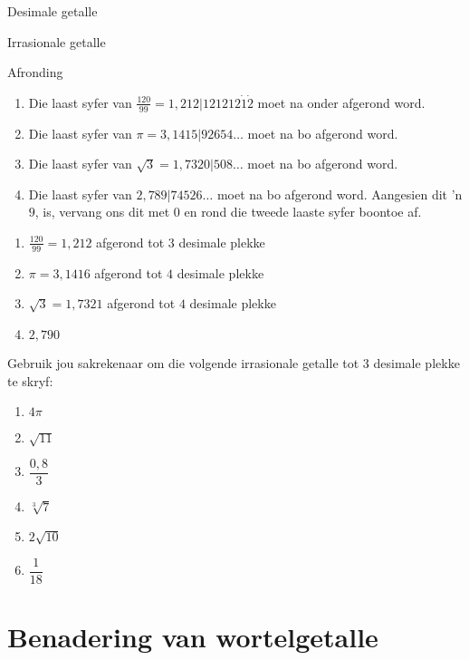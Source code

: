 \begin{Aktiwiteit}{Desimale getalle}
\begin{aktiwiteit}{Irrasionale getalle}
\begin{wex}{Afronding }
{
\begin{enumerate}[itemsep=5pt, label=\textbf{\arabic*}. ]
\item Die laast syfer van $\frac{120}{99}=1,212|121212\dot{1}\dot{2}$  moet na onder afgerond word.
\item Die laast syfer van $\pi =3,1415|92654\ldots$ moet na bo afgerond word.
\item Die laast syfer van $\sqrt{3}=1,7320|508\ldots$ moet na bo afgerond word.
\item Die laast syfer van $2,789|74526\ldots$ moet na bo afgerond word.  
\newline Aangesien dit ’n $9$, is, vervang ons dit met $0$ en
rond die tweede laaste syfer boontoe af.
\end{enumerate}

\begin{enumerate}[itemsep=5pt, label=\textbf{\arabic*}. ]
\item $\frac{120}{99}=1,212$ afgerond tot $3$ desimale plekke
\item $\pi =3,1416$  afgerond tot $4$ desimale plekke
\item $\sqrt{3}=1,7321$ afgerond tot $4$ desimale plekke
\item $2,790$
\end{enumerate}
}  
\end{wex}


\begin{exercises}{}
{
Gebruik jou sakrekenaar om die volgende irrasionale getalle tot $3$ desimale plekke te skryf:
\begin{enumerate}[itemsep=5pt, label=\textbf{\arabic*}. ]
 \item $4\pi$
\item $\sqrt{11}$
\item $\dfrac{0,8}{3}$
\item $\sqrt[3]{7}$
\item $2\sqrt{10}$
\item $\dfrac{1}{18}$
\end{enumerate}

}
\end{exercises}


\section{Benadering van wortelgetalle}
\setcounter{figure}{1}
\setcounter{subfigure}{1}


\end{aktiwiteit}
\end{Aktiwiteit}
